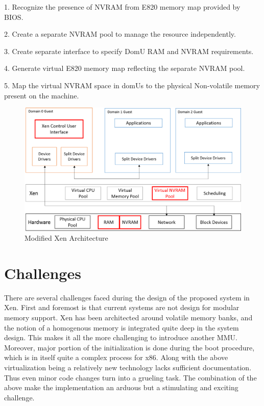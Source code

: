 1. Recognize the presence of NVRAM from E820 memory map provided by BIOS.

2. Create a separate NVRAM pool to manage the resource independently.

3. Create separate interface to specify DomU RAM and NVRAM requirements.

4. Generate virtual E820 memory map reflecting the separate NVRAM pool.

5. Map the virtual NVRAM space in domUs to the physical Non-volatile memory present on the machine. 

\begin{figure}[h]
\centering
\includegraphics[scale=0.6]{figures/Xen_mod_model.png}
\caption{Modified Xen Architecture}
\label{fig:xen_mod}
\end{figure}

\section{Challenges}

There are several challenges faced during the design of the proposed system in Xen. First and foremost is that current systems are not design for modular memory support. Xen has been architected around volatile memory banks, and the notion of a homogenous memory is integrated quite deep in the system design. This makes it all the more challenging to introduce another MMU. Moreover, major portion of the initialization is done during the boot procedure, which is in itself quite a complex process for x86. Along with the above virtualization being a relatively new technology lacks sufficient documentation. Thus even minor code changes turn into a grueling task. The combination of the above make the implementation an arduous but a stimulating and exciting challenge. 


